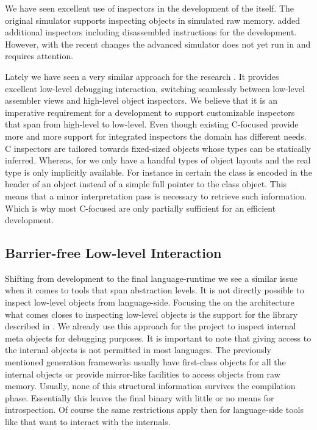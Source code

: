 We have seen excellent use of inspectors in the \VM development of the \Cog \VM itself.
The original simulator supports inspecting objects in simulated raw memory.
\Cog added additional inspectors including disassembled instructions for the \JIT development.
However, with the recent changes the advanced simulator does not yet run in \PH and requires attention.

Lately we have seen a very similar approach for the \Maxine research \VM \cite{Wimm13a}.
It provides excellent low-level debugging interaction, switching seamlessly between low-level assembler views and high-level object inspectors.
We believe that it is an imperative requirement for a \VM development \IDE to support customizable inspectors that span from high-level to low-level.
Even though existing C-focused \IDEs provide more and more support for integrated inspectors the \VM domain has different needs.
C inspectors are tailored towards fixed-sized objects whose types can be statically inferred.
Whereas, for \VMs we only have a handful types of object layouts and the real type is only implicitly available.
For instance in certain \VMs the class is encoded in the header of an object instead of a simple full pointer to the class object.
This means that a minor interpretation pass is necessary to retrieve such information.
Which is why most C-focused \IDEs are only partially sufficient for an efficient \VM development.


\subsection{Barrier-free Low-level Interaction}
Shifting from \VM development to the final language-runtime we see a similar issue when it comes to tools that span abstraction levels.
It is not directly possible to inspect low-level objects from language-side.
Focusing the on the \B architecture what comes closes to inspecting low-level objects is the  support for the \NB \FFI library described in .
We already use this approach for the \NBJ project to inspect \VM internal meta objects for debugging purposes.
It is important to note that giving access to the \VM internal objects is not permitted in most languages.
The previously mentioned \VM generation frameworks usually have first-class objects for all the \VM internal objects or provide mirror-like facilities to access objects from raw memory.
Usually, none of this structural information survives the \VM compilation phase.
Essentially this leaves the final \VM binary with little or no means for introspection. Of course the same restrictions apply then for language-side tools like \B that want to interact with the \VM internals.

